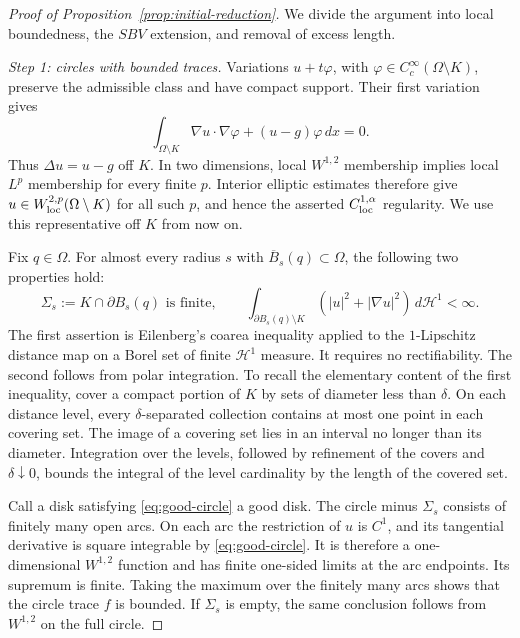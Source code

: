 \begin{proof}[Proof of Proposition~\ref{prop:initial-reduction}]
We divide the argument into local boundedness, the $SBV$ extension,
and removal of excess length.

\smallskip
\noindent\emph{Step 1: circles with bounded traces.}
Variations $u+t\varphi$, with
$\varphi\in C^\infty_c(\Omega\setminus K)$, preserve the admissible
class and have compact support.  Their first variation gives
\[
 \int_{\Omega\setminus K}\nabla u\cdot\nabla\varphi
       +(u-g)\varphi\,dx=0.
\]
Thus $\Delta u=u-g$ off $K$.  In two dimensions, local
$W^{1,2}$ membership implies local $L^p$ membership for every finite
$p$.  Interior elliptic estimates therefore give
$u\in W^{2,p}_{\rm loc}(\Omega\setminus K)$ for all such $p$,
and hence the asserted $C^{1,\alpha}_{\rm loc}$ regularity.  We use
this representative off $K$ from now on.

Fix $q\in\Omega$.  For almost every radius $s$ with
$\overline B_s(q)\subset\Omega$, the following two properties hold:
\begin{equation}
 \Sigma_s:=K\cap\partial B_s(q)\text{ is finite},
 \qquad
 \int_{\partial B_s(q)\setminus K}
           (|u|^2+|\nabla u|^2)\,d\mathcal H^1<\infty.
 \label{eq:good-circle}
\end{equation}
The first assertion is Eilenberg's coarea inequality applied to the
$1$-Lipschitz distance map on a Borel set of finite $\mathcal H^1$
measure.  It requires no rectifiability.  The second follows from
polar integration.  To recall the elementary content of the first
inequality, cover a compact portion of $K$ by sets of diameter less
than $\delta$.  On each distance level, every $\delta$-separated
collection contains at most one point in each covering set.  The
image of a covering set lies in an interval no longer than its
diameter.  Integration over the levels, followed by refinement of
the covers and $\delta\downarrow0$, bounds the integral of the
level cardinality by the length of the covered set.

Call a disk satisfying \eqref{eq:good-circle} a good disk.
The circle minus $\Sigma_s$ consists of finitely many open arcs.
On each arc the restriction of $u$ is $C^1$, and its tangential
derivative is square integrable by \eqref{eq:good-circle}.
It is therefore a one-dimensional $W^{1,2}$ function and has finite
one-sided limits at the arc endpoints.  Its supremum is finite.
Taking the maximum over the finitely many arcs shows that the
circle trace $f$ is bounded.  If $\Sigma_s$ is empty, the same
conclusion follows from $W^{1,2}$ on the full circle.


\end{proof}
